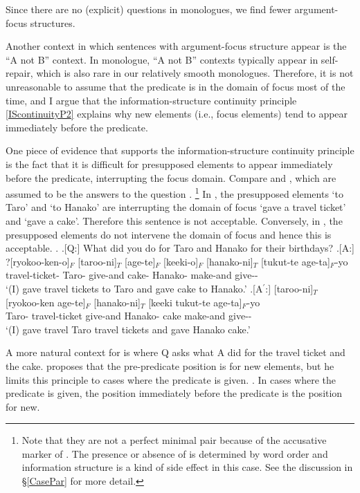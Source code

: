 Since there are no (explicit) questions in monologues,
we find fewer argument-focus structures.

Another context in which sentences with argument-focus structure appear is the ``A not B'' context.
In monologue, ``A not B'' contexts typically appear in self-repair,
which is also rare in our relatively smooth monologues.
Therefore, it is not unreasonable to assume that the predicate is in the domain of focus most of the time,
and I argue that the information-structure continuity principle \ref{IScontinuityP2} explains why new elements (i.e., focus elements) tend to appear immediately before the predicate.

One piece of evidence that supports the information-structure continuity principle is the fact that
it is difficult for presupposed elements to appear immediately before the predicate,
interrupting the focus domain.
Compare \Next[A] and \Next[A$^{\prime}$],
which are assumed to be the answers to the question \Next[Q].%
	\footnote{
	Note that they are not a perfect minimal pair because of the accusative marker of .
	The presence or absence of  is determined by word order and
	information structure is a kind of side effect in this case.
	See the discussion in \S \ref{CasePar} for more detail.
	}
In \Next[A],
the presupposed elements  `to Taro' and  `to Hanako' are interrupting the domain of focus `gave a travel ticket' and `gave a cake'.
Therefore this sentence is not acceptable.
Conversely, in \Next[A$^{\prime}$],
the presupposed elements do not intervene the domain of focus and hence this is acceptable.
%
\ex.
 \a.[Q:] What did you do for Taro and Hanako for their birthdays?
 \bg.[A:] ?[ryokoo-ken-o]$_{F}$ [taroo-ni]$_{T}$ [age-te]$_{F}$ [keeki-o]$_{F}$ [hanako-ni]$_{T}$ [tukut-te age-ta]$_{F}$-yo \\
 			travel-ticket- Taro- give-and cake- Hanako- make-and give-- \\
			`(I) gave travel tickets to Taro and gave cake to Hanako.'
 \bg.[A$^{\prime}$:] [taroo-ni]$_{T}$ [ryokoo-ken age-te]$_{F}$ [hanako-ni]$_{T}$ [keeki tukut-te age-ta]$_{F}$-yo \\
 			Taro- travel-ticket give-and Hanako- cake make-and give-- \\
			`(I) gave travel Taro travel tickets and gave Hanako cake.'

A more natural context for \Last[A] is where Q asks
what A did for the travel ticket and the cake.
 proposes that
the pre-predicate position is for new elements,
but he limits this principle to cases
where the predicate is given.
%
\ex.
 In cases where the predicate is given,
 the position immediately before the predicate is the position for new.
 \hfill{\cite[][60, translated by the current author]{kuno78}}

